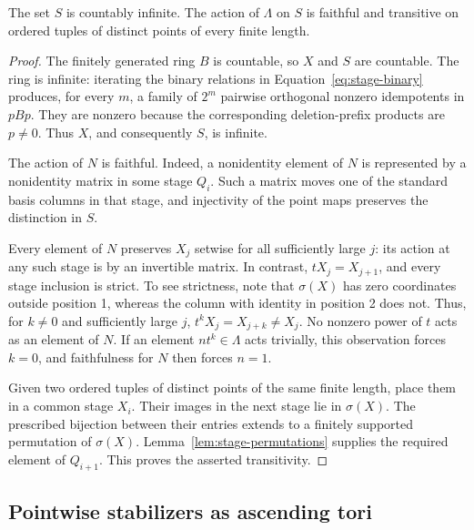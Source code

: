 \begin{lemma}\label{lem:stage-faithful-transitive}
The set $S$ is countably infinite.  The action of $\Lambda$ on $S$
is faithful and transitive on ordered tuples of distinct points
of every finite length.
\end{lemma}

\begin{proof}
The finitely generated ring $B$ is countable, so $X$ and $S$ are
countable.  The ring is infinite: iterating the binary relations
in Equation~\eqref{eq:stage-binary} produces, for every $m$, a
family of $2^m$ pairwise orthogonal nonzero idempotents in $pBp$.
They are nonzero because the corresponding deletion-prefix products
are $p\ne0$.  Thus $X$, and consequently $S$, is infinite.

The action of $N$ is faithful.  Indeed, a nonidentity element of
$N$ is represented by a nonidentity matrix in some stage $Q_i$.
Such a matrix moves one of the standard basis columns in that stage,
and injectivity of the point maps preserves the distinction in $S$.

Every element of $N$ preserves $X_j$ setwise for all sufficiently
large $j$: its action at any such stage is by an invertible matrix.
In contrast, $tX_j=X_{j+1}$, and every stage inclusion is strict.
To see strictness, note that $\sigma(X)$ has zero coordinates
outside position 1, whereas the column with identity in position 2
does not.  Thus, for $k\ne0$ and sufficiently large $j$,
$t^kX_j=X_{j+k}\ne X_j$.  No nonzero power of $t$ acts as an
element of $N$.  If an element $nt^k\in\Lambda$ acts trivially,
this observation forces $k=0$, and faithfulness for $N$ then forces
$n=1$.

Given two ordered tuples of distinct points of the same finite
length, place them in a common stage $X_i$.  Their images in the
next stage lie in $\sigma(X)$.  The prescribed bijection between
their entries extends to a finitely supported permutation of
$\sigma(X)$.
Lemma~\ref{lem:stage-permutations} supplies the required element
of $Q_{i+1}$.  This proves the asserted transitivity.
\end{proof}

\subsection{Pointwise stabilizers as ascending tori}

